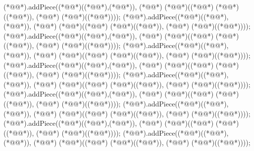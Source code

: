 \begin{vdm_al}
    (*@@*).addPiece((*@@*)((*@@*),(*@@*)), (*@@*) (*@@*)((*@@*) (*@@*)((*@@*)), (*@@*) (*@@*)((*@@*))));
    (*@@*).addPiece((*@@*)((*@@*),(*@@*)), (*@@*) (*@@*)((*@@*) (*@@*)((*@@*)), (*@@*) (*@@*)((*@@*))));
    (*@@*).addPiece((*@@*)((*@@*),(*@@*)), (*@@*) (*@@*)((*@@*) (*@@*)((*@@*)), (*@@*) (*@@*)((*@@*))));
    (*@@*).addPiece((*@@*)((*@@*),(*@@*)), (*@@*) (*@@*)((*@@*) (*@@*)((*@@*)), (*@@*) (*@@*)((*@@*))));
    (*@@*).addPiece((*@@*)((*@@*),(*@@*)), (*@@*) (*@@*)((*@@*) (*@@*)((*@@*)), (*@@*) (*@@*)((*@@*))));
    (*@@*).addPiece((*@@*)((*@@*),(*@@*)), (*@@*) (*@@*)((*@@*) (*@@*)((*@@*)), (*@@*) (*@@*)((*@@*))));
    (*@@*).addPiece((*@@*)((*@@*),(*@@*)), (*@@*) (*@@*)((*@@*) (*@@*)((*@@*)), (*@@*) (*@@*)((*@@*))));
    (*@@*).addPiece((*@@*)((*@@*),(*@@*)), (*@@*) (*@@*)((*@@*) (*@@*)((*@@*)), (*@@*) (*@@*)((*@@*))));
    (*@@*).addPiece((*@@*)((*@@*),(*@@*)), (*@@*) (*@@*)((*@@*) (*@@*)((*@@*)), (*@@*) (*@@*)((*@@*))));
    (*@@*).addPiece((*@@*)((*@@*),(*@@*)), (*@@*) (*@@*)((*@@*) (*@@*)((*@@*)), (*@@*) (*@@*)((*@@*))));
    

\end{vdm_al}
